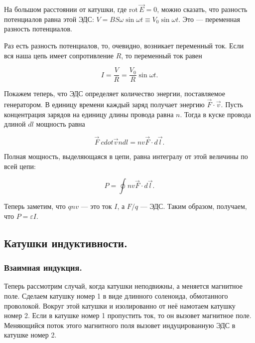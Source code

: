 \documentclass[11pt,a4paper]{article}
\numberwithin{equation}{section}
\newcommand{\rot}{\mathrm{rot}\,}
\newcommand{\vareps}{\varepsilon}
\begin{document}
На большом расстоянии от катушки, где $\rot \vec{E} =0$, можно
сказать, что разность потенциалов равна этой ЭДС: $V = B S \omega \sin
\omega t \equiv V_0 \sin \omega t$. Это --- переменная разность
потенциалов. 

Раз есть разность потенциалов, то, очевидно, возникает переменный
ток. Если вся наша цепь имеет сопротивление $R$, то переменный ток
равен

\begin{equation}
  \label{eq:generator_current}
  I = \frac{V}{R} = \frac{V_0}{R} \sin \omega t.
\end{equation}

Покажем теперь, что ЭДС определяет количество энергии, поставляемое
генератором. В единицу времени каждый заряд получает энергию $\vec{F}
\cdot \vec{v}$. Пусть концентрация зарядов на единицу длины провода
равна $n$. Тогда в куске провода длиной $dl$ мощность равна

\begin{equation}
  \label{eq:generator_power_1}
  \vec{F} \ cdot \vec{v} n dl = nv \vec{F} \cdot d\vec{l}.
\end{equation}

Полная мощность, выделяющаяся в цепи, равна интегралу от этой
величины по всей цепи:

\begin{equation}
  \label{eq:generator_power_2}
  P = \oint nv \vec{F} \cdot d\vec{l}.
\end{equation}

Теперь заметим, что $qnv$ --- это ток $I$, а $F/q$ --- ЭДС. Таким
образом, получаем, что $P = \vareps I$.

\subsection{Катушки индуктивности.}
\label{sec:coil}

\subsubsection{Взаимная индукция.}
\label{sec:common_induction}

Теперь рассмотрим случай, когда катушки неподвижны, а меняется
магнитное поле. Сделаем катушку номер 1 в виде длинного соленоида,
обмотанного проволокой. Вокруг этой катушки и изолированно от неё
намотаем катушку номер 2. Если в катушке номер 1 пропустить ток, то он
вызовет магнитное поле. Меняющийся поток этого магнитного поля вызовет
индуцированную ЭДС в катушке номер 2. 
\end{document}
